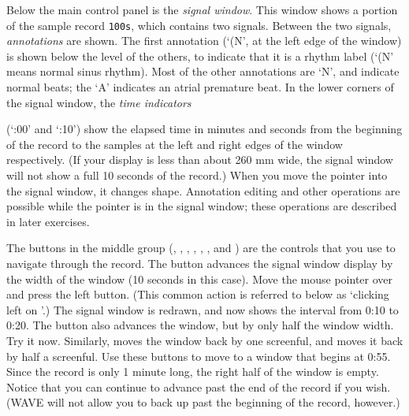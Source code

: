 \documentclass[twoside]{book}
\newcommand{\button}[1]{\cornersize{2}\ovalbox{\rule[-.3mm]{0cm}{2.5mm}\small\sf ~#1~}}
\newcommand{\WAVE}{{\sf WAVE}\xspace}
\begin{document}
\begin{htmlonly}
\end{htmlonly}
\begin{latexonly}
\end{latexonly}
Below the main control panel is the \emph{signal window}.
This window shows a
portion of the sample record {\tt 100s}, which contains two signals.
Between the two signals, \emph{annotations} are shown.
The first annotation (`{\sf (N}', at
the left edge of the window) is shown below the level of the others, to
indicate that it is a rhythm label
(`{\sf (N}' means normal sinus rhythm).
Most of the other annotations are `{\sf N}', and indicate normal beats; the
`{\sf A}' indicates an atrial premature beat.  In the lower corners of the
signal window, the \emph{time indicators}
\begin{htmlonly}
\end{htmlonly}
\begin{latexonly}
\end{latexonly}
(`{:00}' and `{:10}') show the
elapsed time in minutes and seconds from the beginning of the record to the
samples at the left and right edges of the window respectively.  (If your
display is less than about 260 mm wide, the signal window will not show a full
10 seconds of the record.)  When you move the pointer into the signal window,
it changes shape.  Annotation editing and other operations are possible while
the pointer is in the signal window; these operations are described in later
exercises.

The buttons in the middle group (\button{{\tt <} Search}, \button{\tt <<},
\button{\tt <}, \button{Find...}, \button{\tt >}, \button{\tt >>}, and
\button{Search {\tt >}}) are the controls
that you use to navigate
through the record.  The \button{\tt >>} button advances the signal window
display by the width of the window (10 seconds in this case).  Move
the mouse pointer over \button{\tt >>} and press the left button.
(This common action is referred to below as `clicking left on \button{\tt
>>}'.)  The signal window is redrawn, and now shows the interval from
0:10 to 0:20.  The \button{\tt >} button also advances the window, but by
only half the window width.  Try it now.  Similarly, \button{\tt <<}
moves the window back by one screenful, and \button{\tt <}
moves it back by half a screenful.  Use these buttons to move to a
window that begins at 0:55.  Since the record is only 1 minute long,
the right half of the window is empty.  Notice that you can continue
to advance past the end of the record if you wish.  (\WAVE{} will
not allow you to back up past the beginning of the record, however.)
\end{document}
